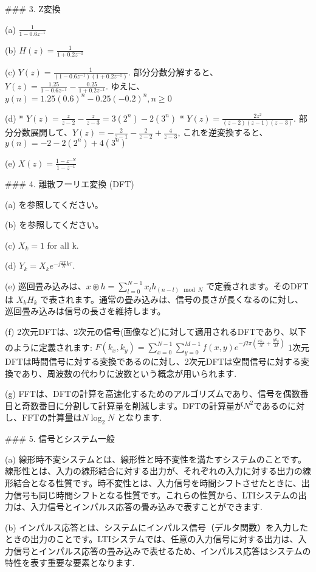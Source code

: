 \documentclass{ltjsarticle}
\begin{document}
### 3. Z変換

(a) $\frac{1}{1 - 0.6z^{-1}}$

(b)  $H(z) = \frac{1}{1 + 0.2z^{-1}}$

(c) $Y(z) = \frac{1}{(1-0.6z^{-1})(1+0.2z^{-1})}$. 部分分数分解すると、 $Y(z) = \frac{1.25}{1-0.6z^{-1}} - \frac{0.25}{1+0.2z^{-1}}$. ゆえに、 $y(n) = 1.25(0.6)^n - 0.25(-0.2)^n, n\ge0$

(d)
    *   $Y(z) = \frac{z}{z-2} - \frac{z}{z-3} = 3(2^n) - 2(3^n)$
    *   $Y(z) = \frac{2z^2}{(z-2)(z-1)(z-3)}$. 部分分数展開して、$Y(z) = -\frac{2}{z-1} - \frac{2}{z-2} + \frac{4}{z-3}$, これを逆変換すると、$y(n) = -2 - 2(2^n) + 4(3^n)$

(e) $X(z) = \frac{1-z^{-N}}{1-z^{-1}}$

### 4. 離散フーリエ変換 (DFT)

(a) を参照してください。

(b) を参照してください。

(c)  $X_k = 1$ for all k.

(d) $Y_k = X_k e^{-j \frac{2\pi}{N}k\tau}$.

(e) 巡回畳み込みは、$x \circledast h = \sum_{l=0}^{N-1} x_l h_{(n-l) \mod N}$ で定義されます。そのDFTは $X_k H_k$ で表されます。通常の畳み込みは、信号の長さが長くなるのに対し、巡回畳み込みは信号の長さを維持します。

(f) 2次元DFTは、2次元の信号(画像など)に対して適用されるDFTであり、以下のように定義されます:
  $F(k_x, k_y) = \sum_{x=0}^{N-1} \sum_{y=0}^{M-1} f(x, y) e^{-j2\pi (\frac{x k_x}{N} + \frac{y k_y}{M})}$
    1次元DFTは時間信号に対する変換であるのに対し、2次元DFTは空間信号に対する変換であり、周波数の代わりに波数という概念が用いられます.

(g) FFTは、DFTの計算を高速化するためのアルゴリズムであり、信号を偶数番目と奇数番目に分割して計算量を削減します。DFTの計算量が$N^2$であるのに対し、FFTの計算量は$N \log_2 N$ となります.

### 5. 信号とシステム一般

(a) 線形時不変システムとは、線形性と時不変性を満たすシステムのことです。線形性とは、入力の線形結合に対する出力が、それぞれの入力に対する出力の線形結合となる性質です。時不変性とは、入力信号を時間シフトさせたときに、出力信号も同じ時間シフトとなる性質です。これらの性質から、LTIシステムの出力は、入力信号とインパルス応答の畳み込みで表すことができます.

(b) インパルス応答とは、システムにインパルス信号（デルタ関数）を入力したときの出力のことです。LTIシステムでは、任意の入力信号に対する出力は、入力信号とインパルス応答の畳み込みで表せるため、インパルス応答はシステムの特性を表す重要な要素となります.
\end{document}
